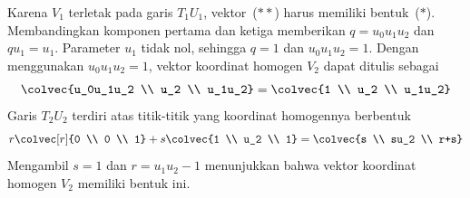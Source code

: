 \begin{exercises}
\begin{answer}
\begin{exparts}
           Karena $V_1$ terletak pada garis $T_1U_1$, vektor~($**$) harus
           memiliki bentuk~($*$). Membandingkan komponen pertama dan ketiga
           memberikan $q=u_0u_1u_2$ dan $qu_1=u_1$.
           Parameter $u_1$ tidak nol, sehingga $q=1$ dan
           $u_0u_1u_2=1$.
         \partsitem  
           Dengan menggunakan $u_0u_1u_2=1$, vektor koordinat homogen $V_2$
           dapat ditulis sebagai
           \begin{equation*}
             \colvec{u_0u_1u_2 \\ u_2 \\ u_1u_2}
             =\colvec{1 \\ u_2 \\ u_1u_2}
           \end{equation*}
           Garis $T_2U_2$ terdiri atas titik-titik yang koordinat homogennya
           berbentuk
           \begin{equation*}
             r\colvec[r]{0 \\ 0 \\ 1}+s\colvec{1 \\ u_2 \\ 1}
             =\colvec{s \\ su_2 \\ r+s}
           \end{equation*}
           Mengambil $s=1$ dan $r=u_1u_2-1$ menunjukkan bahwa vektor koordinat
           homogen $V_2$ memiliki bentuk ini.
      \end{exparts}
    \end{answer}
\end{exercises}
\endinput
